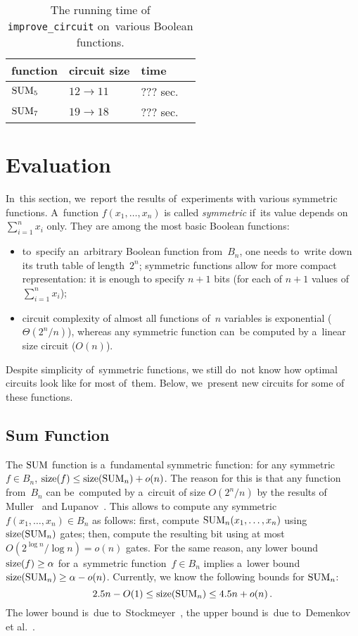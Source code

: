 \begin{table}[ht]
\begin{center}
\begin{tabular}{llll}
\toprule
function & circuit size & time\\
\midrule
$\operatorname{SUM}_5$ & $12 \to 11$ & ??? sec.\\
$\operatorname{SUM}_7$ & $19 \to 18$ & ??? sec.\\
\bottomrule
\end{tabular}
\end{center}
\caption{The running time of \texttt{improve\_circuit} on~various Boolean functions.} \label{table:improvementrunningtimes}
\end{table}



\section{Evaluation}
In~this section, we~report the results of~experiments
with various symmetric functions. A~function $f(x_1,\dotsc,x_n)$ is called \emph{symmetric} if~its value depends on~$\sum_{i=1}^nx_i$ only. They are among the most basic Boolean functions:
\begin{itemize}
\item to~specify an~arbitrary Boolean function
from~$B_n$, one needs
to~write down its truth table of length~$2^n$; symmetric functions allow for more compact representation: it is enough to specify $n+1$ bits (for each of $n+1$ values
of~$\sum_{i=1}^nx_i$);
\item circuit complexity of almost all functions
of~$n$ variables is exponential ($\Theta(2^n/n)$), whereas any symmetric function can~be computed by a~linear size circuit ($O(n)$).
\end{itemize}
Despite simplicity of~symmetric functions, we still do~not
know how optimal circuits look like for most of~them. Below, we~present new circuits for some of these functions.

\subsection{Sum Function}
The $\operatorname{SUM}$ function is a~fundamental symmetric function: for any symmetric $f \in B_n$, $\operatorname{size}(f)\le \operatorname{size}(\operatorname{SUM}_n)+o(n)$. The reason for this is that any function from~$B_n$ can be~computed by a~circuit of size $O(2^n/n)$ by the results of Muller~\cite{M56} and Lupanov~\cite{Lup59}. This allows to compute any symmetric $f(x_1, \dotsc, x_n) \in B_n$ as follows: first, compute $\operatorname{SUM}_n(x_1, \dotsc, x_n)$ using $\operatorname{size}(\operatorname{SUM}_n)$ gates; then, compute the resulting bit using at most $O(2^{\log n}/\log n)=o(n)$ gates. For the same reason, any lower bound $\operatorname{size}(f) \ge \alpha$ for
a~symmetric function~$f \in B_n$ implies a~lower bound $\operatorname{size}(\operatorname{SUM}_n) \ge \alpha-o(n)$. Currently, we know the following bounds for $\operatorname{SUM}_n$:
\[2.5n-O(1) \le \operatorname{size}(\operatorname{SUM}_n) \le 4.5n+o(n) \, .\]
The lower bound is~due to~Stockmeyer~\cite{DBLP:journals/mst/Stockmeyer77}, the upper bound is~due to~Demenkov et al.~\cite{DBLP:journals/ipl/DemenkovKKY10}.


